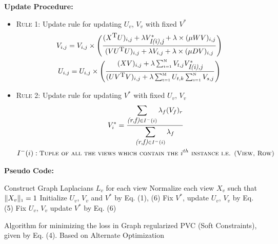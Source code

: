 \documentclass[a4paper]{article}
\begin{document}
	\noindent
	\textbf{Update Procedure:}
	\begin{itemize}
		\item \textsc{Rule 1:}	Update rule for updating $U_{v}$, ${V_{v}}$ with fixed $V^{*}$ 
			\begin{multline}
			V_{i,j} = V_{i,j} \times \Bigg( \frac{(X^{\text{\small{T}}}U)_{i,j}+\lambda V^{*}_{{\textit{\small{I(i),j}}}} +\lambda \times (\mu WV)_{i,j}}{(V U^{\text{\small{T}}} U)_{i,j} + \lambda V_{i,j} +\lambda \times (\mu DV)_{i,j}} \Bigg) \\
			U_{i,j} = U_{i,j} \times \Bigg( \frac{(XV)_{i,j}
			+ \lambda  \sum_{\text{\tiny{t=1}}}^{\text{\tiny{N}}} 
			V_{t,j}V^{*}_\textit{\small{I(i),j}}}
			{(U V^{\text{\small{T}}} V)_{i,j} 
			+ \lambda \sum_{\text{\tiny{t=1}}}^{\text{\tiny{M}}} U_{t,k} 
			\sum_{\text{\tiny{s=1}}}^{\text{\tiny{N}}}V_{s,j}} \Bigg)
			\end{multline}
		\item \textsc{Rule 2:}	Update rule for updating $V^{*}$ with fixed $U_{v}$, ${V_{v}}$ 
			\begin{multline}
			V_{i}^{*} = \frac
			{\displaystyle \sum_{\textit{\small{(r,f)}} \in I^{-}(i)} \lambda_{f} (V_{f})_{r}}
			{\displaystyle \sum_{\textit{\small{(r,f)}} \in I^{-}(i)} \lambda_{f} }\\
			 I^{-}(i) : 
			\textsc{\small{Tuple of all the views which contain the }} i^{th} {\textsc{\small{ instance i.e. (View, Row)}}}
			\end{multline}
	\end{itemize}		
	
	\noindent
	\textbf{Pseudo Code:}	
	\begin{algorithm}
		Construct Graph Laplacians $L_{v}$ for each view\;
		Normalize each view $X_{v}$ such that $\|X_{v}\|_{\text{\tiny1}} = 1 $\;
		Initialize  $U_{v}$, $V_{v}$ and $V^{*}$ by Eq. (1), (6)\;
		{
			{
				{
					Fix $V^{*}$, update $U_{v}$, $V_{v}$ by Eq. (5)\;
				}
			}
			Fix $U_{v}$, $V_{v}$ update $V^{*}$ by Eq. (6)\;		
		}						
		\caption{Algorithm for minimizing the loss in Graph regularized PVC (Soft Constraints), given by Eq. (4). Based on Alternate Optimization}
	\end{algorithm}
\end{document}
